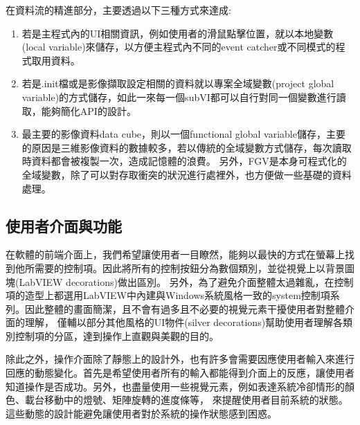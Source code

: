 \documentclass[12pt]{article}
\begin{document}
在資料流的精進部分，主要透過以下三種方式來達成:
\begin{enumerate}
    \item 若是主程式內的UI相關資訊，例如使用者的滑鼠點擊位置，就以本地變數(local variable)來儲存，以方便主程式內不同的event catcher或不同模式的程式取用資料。
    \item 若是.init檔或是影像擷取設定相關的資料就以專案全域變數(project global variable)的方式儲存，如此一來每一個subVI都可以自行對同一個變數進行讀取，能夠簡化API的設計。
    \item 最主要的影像資料data cube，則以一個functional global variable儲存，主要的原因是三維影像資料的數據較多，若以傳統的全域變數方式儲存，每次讀取時資料都會被複製一次，造成記憶體的浪費。
          另外，FGV是本身可程式化的全域變數，除了可以對存取衝突的狀況進行處裡外，也方便做一些基礎的資料處理。
\end{enumerate}

\subsection{使用者介面與功能}
在軟體的前端介面上，我們希望讓使用者一目瞭然，能夠以最快的方式在螢幕上找到他所需要的控制項。因此將所有的控制按鈕分為數個類別，並從視覺上以背景圖塊(LabVIEW decorations)做出區別。
另外，為了避免介面整體太過雜亂，在控制項的造型上都選用LabVIEW中內建與Windows系統風格一致的system控制項系列。因此整體的畫面簡潔，且不會有過多且不必要的視覺元素干擾使用者對整體介面的理解，
僅輔以部分其他風格的UI物件(silver decorations)幫助使用者理解各類別控制項的分區，達到操作上直觀與美觀的目的。

除此之外，操作介面除了靜態上的設計外，也有許多會需要因應使用者輸入來進行回應的動態變化。首先是希望使用者所有的輸入都能得到介面上的反應，讓使用者知道操作是否成功。另外，也盡量使用一些視覺元素，例如表達系統冷卻情形的顏色、載台移動中的燈號、矩陣旋轉的進度條等，
來提醒使用者目前系統的狀態。這些動態的設計能避免讓使用者對於系統的操作狀態感到困惑。
\end{document}
